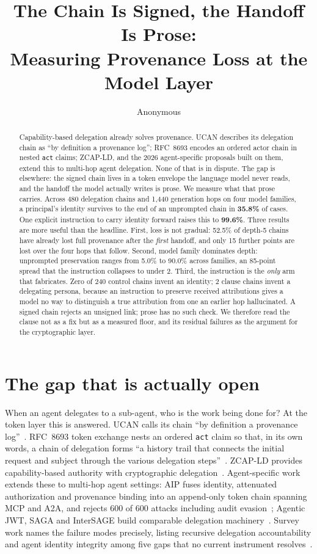 \documentclass{article}
\title{The Chain Is Signed, the Handoff Is Prose:\\Measuring Provenance Loss at the Model Layer}
\author{%
  Anonymous \\
}
\begin{document}
\maketitle

\begin{abstract}
Capability-based delegation already solves provenance. UCAN describes its delegation chain as
``by definition a provenance log''; RFC~8693 encodes an ordered actor chain in nested \texttt{act}
claims; ZCAP-LD, and the 2026 agent-specific proposals built on them, extend this to multi-hop
agent delegation. None of that is in dispute. The gap is elsewhere: the signed chain lives in a
token envelope the language model never reads, and the handoff the model actually writes is prose.
We measure what that prose carries. Across 480 delegation chains and 1{,}440 generation hops on
four model families, a principal's identity survives to the end of an unprompted chain in
\textbf{35.8\%} of cases. One explicit instruction to carry identity forward raises this to
\textbf{99.6\%}. Three results are more useful than the headline. First, loss is not gradual: 52.5\%
of depth-5 chains have already lost full provenance after the \emph{first} handoff, and only 15
further points are lost over the four hops that follow. Second, model family dominates depth: unprompted
preservation ranges from 5.0\% to 90.0\% across families, an 85-point spread that the instruction
collapses to under 2. Third, the instruction is the \emph{only} arm that fabricates. Zero of 240
control chains invent an identity; 2 clause chains invent a delegating persona, because an
instruction to preserve received attributions gives a model no way to distinguish a true
attribution from one an earlier hop hallucinated. A signed chain rejects an unsigned link; prose
has no such check. We therefore read the clause not as a fix but as a measured floor, and its
residual failures as the argument for the cryptographic layer.
\end{abstract}

\section{The gap that is actually open}

When an agent delegates to a sub-agent, who is the work being done for? At the token layer this is
answered. UCAN calls its chain ``by definition a provenance log''~\citep{ucan}. RFC~8693 token
exchange nests an ordered \texttt{act} claim so that, in its own words, a chain of delegation
forms ``a history trail that connects the initial request and subject through the various
delegation steps''~\citep{rfc8693}. ZCAP-LD provides capability-based authority with
cryptographic delegation~\citep{zcap}. Agent-specific work extends these to multi-hop agent
settings: AIP fuses identity, attenuated authorization and provenance binding into an
append-only token chain spanning MCP and A2A, and rejects 600 of 600 attacks including audit
evasion~\citep{aip}; Agentic JWT, SAGA and InterSAGE build comparable delegation
machinery~\citep{agenticjwt,saga,intersage}. Survey work names the failure modes precisely,
listing
recursive delegation accountability and agent identity integrity among five gaps that no
current instrument resolves~\citep{aiidentity}.
\end{document}
